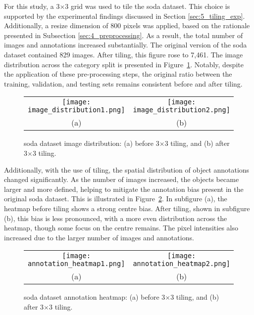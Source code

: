 For this study, a 3$\times$3 grid was used to tile the \gls{soda} dataset. This choice is supported by the experimental findings discussed in Section \ref{sec:5_tiling_exp}. Additionally, a resize dimension of 800 pixels was applied, based on the rationale presented in Subsection \ref{sec:4_preprocessing}. As a result, the total number of images and annotations increased substantially. The original version of the \gls{soda} dataset contained 829 images. After tiling, this figure rose to 7,461. The image distribution across the category split is presented in Figure~\ref{fig:soda_image_distribution}. Notably, despite the application of these pre-processing steps, the original ratio between the training, validation, and testing sets remains consistent before and after tiling.
\begin{figure}[ht]
  \centering
  \begin{tabular}{cc}
    \texttt{[image: image\_distribution1.png]} &
    \texttt{[image: image\_distribution2.png]} \\
    \small (a) & \small (b) \\
  \end{tabular}
  \caption{\gls{soda} dataset image distribution: (a) before 3$\times$3 tiling, and (b) after 3$\times$3 tiling.}
  \label{fig:soda_image_distribution}
\end{figure}

Additionally, with the use of tiling, the spatial distribution of object annotations changed significantly. As the number of images increased, the objects became larger and more defined, helping to mitigate the annotation bias present in the original \gls{soda} dataset. This is illustrated in Figure~\ref{fig:soda_annotation_heatmap}. In subfigure (a), the heatmap before tiling shows a strong centre bias. After tiling, shown in subfigure (b), this bias is less pronounced, with a more even distribution across the heatmap, though some focus on the centre remains. The pixel intensities also increased due to the larger number of images and annotations.

\begin{figure}[ht]
  \centering
  \begin{tabular}{cc}
    \texttt{[image: annotation\_heatmap1.png]} &
    \texttt{[image: annotation\_heatmap2.png]} \\
    \small (a) & \small (b) \\
  \end{tabular}
  \caption{\gls{soda} dataset annotation heatmap: (a) before 3$\times$3 tiling, and (b) after 3$\times$3 tiling.}
  \label{fig:soda_annotation_heatmap}
\end{figure}

